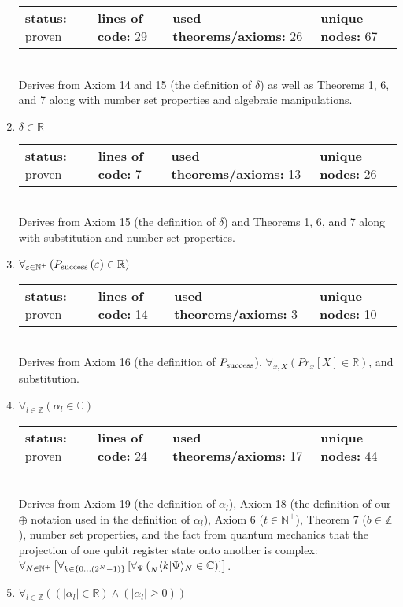 \documentclass{article}[12pt]
\begin{document}
\begin{enumerate}
\begin{tabular}{l | l | l | l}
    \textbf{status:} proven & \textbf{lines of code:} 29 & \textbf{used theorems/axioms:} 26 & \textbf{unique nodes:} 67
  \end{tabular} \hfill \\
Derives from Axiom 14 and 15 (the definition of $\delta$) as well as Theorems 1, 6, and 7 along with number set properties and algebraic manipulations.
\item $\delta \in \mathbb{R}$ \hfill \\
  \begin{tabular}{l | l | l | l}
    \textbf{status:} proven & \textbf{lines of code:} 7 & \textbf{used theorems/axioms:} 13 & \textbf{unique nodes:} 26
  \end{tabular} \hfill \\
  Derives from Axiom 15 (the definition of $\delta$) and Theorems 1, 6, and 7 along with substitution and number set properties.
\item $\forall_{ \varepsilon  \in \mathbb{N}^+} \left(P_{\rm success}\left( \varepsilon \right) \in \mathbb{R}\right)$ \\
  \begin{tabular}{l | l | l | l}
    \textbf{status:} proven & \textbf{lines of code:} 14 & \textbf{used theorems/axioms:} 3 & \textbf{unique nodes:} 10
  \end{tabular} \hfill \\
  Derives from Axiom 16 (the definition of $P_{\rm success}$), $\forall_{ x , X } \left(Pr_{x}[X] \in \mathbb{R}\right)$, and substitution.
\item $\forall_{l \in \mathbb{Z}} \left(\alpha_{l} \in \mathbb{C}\right)$ \hfill \\
  \begin{tabular}{l | l | l | l}
    \textbf{status:} proven & \textbf{lines of code:} 24 & \textbf{used theorems/axioms:} 17 & \textbf{unique nodes:} 44
  \end{tabular} \hfill \\
  Derives from Axiom 19 (the definition of $\alpha_l$), Axiom 18 (the definition of our $\oplus$ notation used in the definition of $\alpha_l$), Axiom 6 ($t \in \mathbb{N}^+$), Theorem 7 ($b \in \mathbb{Z}$), number set properties, and the fact from quantum mechanics that the projection of one qubit register state onto another is complex:
  $\forall_{ N  \in \mathbb{N}^+} \left[\forall_{ k  \in \{0\ldots \left(2^{N} - 1\right)\}} \left[\forall_{ \Psi } \left(\prescript{}{N}\langle k \rvert\Psi \rangle_{N} \in \mathbb{C}\right)\right]\right]$.
\item $\forall_{l \in \mathbb{Z}} \left(\left(\left|\alpha_{l}\right| \in \mathbb{R}\right) \land \left(\left|\alpha_{l}\right| \geq 0\right)\right)$ \hfill \\

\end{enumerate}
\end{document}
